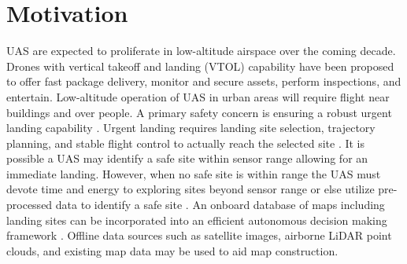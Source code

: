 
\section{Motivation}

\acf{UAS} are expected to proliferate in low-altitude airspace over the coming decade. Drones with vertical takeoff and landing (VTOL) capability have been proposed to offer fast package delivery, monitor and secure assets, perform inspections, and entertain.
Low-altitude operation of UAS in urban areas will require flight near buildings and over people. 
A primary safety concern is ensuring a robust urgent landing capability \cite{winnefeld_unmanned_2011,degarmo_issues_2013}.  Urgent landing requires landing site selection, trajectory planning, and stable flight control to actually reach the selected site \cite{atkins_emergency_2006}. It is possible a UAS may identify a safe site within sensor range allowing for an immediate landing.  However, when no safe site is within range the UAS must devote time and energy to exploring sites beyond sensor range or else utilize pre-processed data to identify a safe site \cite{ten_harmsel_emergency_2017,ochoa_fail-safe_2017}.  An onboard database of maps including landing sites can be incorporated into an efficient autonomous decision making framework \cite{sankararaman_towards_2017}. Offline data sources such as satellite images, airborne LiDAR point clouds, and existing map data may be used to aid map construction.


